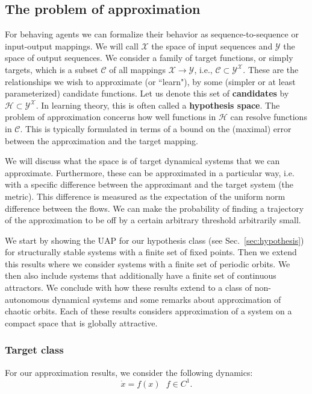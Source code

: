 \documentclass{article}
\theoremstyle{definition}
\theoremstyle{remark}
\newcounter{ct}
\begin{document}
\subsection{The problem of approximation}\label{sec:approximationtheory} %
For behaving agents we can formalize their behavior as sequence-to-sequence or input-output mappings.
We will call $\mathcal{X}$ the space of input sequences and $\mathcal{Y}$ the space of output sequences.
We consider a family of target functions, or simply targets, which is a subset \(\mathcal{C} \) of all mappings \( \mathcal{X} \rightarrow \mathcal{Y} \), i.e., \( \mathcal{C} \subset \mathcal{Y}^\mathcal{X} \). 
These are the relationships we wish to approximate (or ``learn"), by some (simpler or at least parameterized) candidate functions.
Let us denote this set of \textbf{candidates} by \( \mathcal{H} \subset \mathcal{Y}^\mathcal{X} \).
In learning theory, this is often called a \textbf{hypothesis space}.
The problem of approximation concerns how well functions in \( \mathcal{H} \) can resolve functions in \( \mathcal{C} \).
This is typically formulated in terms of a bound on the (maximal) error between the approximation and the target mapping.

We will discuss what the space is of target dynamical systems that we can approximate.
Furthermore, these can be approximated in a particular way, i.e. with a specific difference between the approximant and the target system (the metric).
This difference is measured as the expectation of the uniform norm difference between the flows. 
We can make the probability of finding a trajectory of the approximation to be off by a certain arbitrary threshold arbitrarily small. 


We start by showing the UAP for our hypothesis class (see Sec.~\ref{sec:hypothesis}) for structurally stable systems with a finite set of fixed points.
Then we extend this results where we consider systems with a finite set of periodic orbits.
We then also include systems that additionally have a finite set of continuous attractors.
We conclude with how these results extend to a class of non-autonomous dynamical systems and some remarks about approximation of chaotic orbits.
Each of these results considers approximation of a system on a compact space that is globally attractive. %



\subsubsection{Target class}\label{sec:target}
For our approximation results, we consider the following dynamics:
\begin{equation}
\dot x = f(x)   \ \ \ f\in C^1.
\end{equation}
\end{document}
